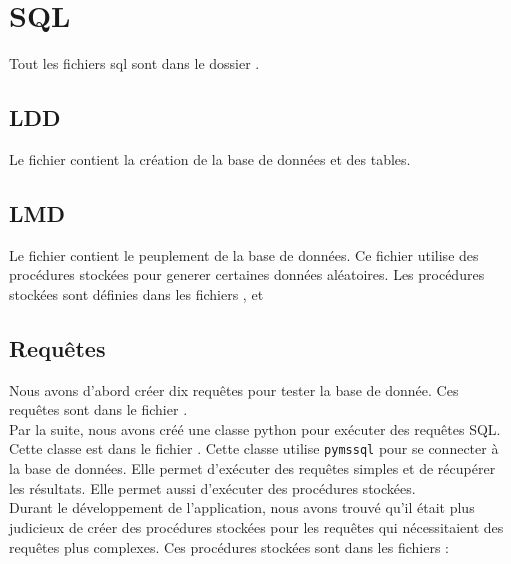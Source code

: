 \documentclass{article}
\newcommand{\n}{\\ [6pt]}
\begin{document}
\section{SQL}

Tout les fichiers sql sont dans le dossier
\href{https://github.com/ZGaillard/projet_session_2935/tree/main/database}{}.
\subsection{LDD}
Le fichier
\href{https://github.com/ZGaillard/projet_session_2935/blob/main/database/CreateUpdated.sql}{}
contient la création de la base de données et des tables.

\subsection{LMD}
Le fichier
\href{https://github.com/ZGaillard/projet_session_2935/blob/main/database/Populate.sql}{}
contient le peuplement de la base de données. Ce fichier utilise des
procédures stockées pour generer certaines données aléatoires.
Les procédures stockées sont définies dans les fichiers 
  \href{https://github.com/ZGaillard/projet_session_2935/blob/main/database/GenCastingArtistes.sql}{},
  \href{https://github.com/ZGaillard/projet_session_2935/blob/main/database/GenArtisteSport.sql}{}
  et
  \href{https://github.com/ZGaillard/projet_session_2935/blob/main/database/GenArtisteHabit.sql
  }{}

  \newpage
\subsection{Requêtes}
Nous avons d'abord créer dix requêtes pour tester la base de
donnée. Ces requêtes sont dans le fichier
\href{https://github.com/ZGaillard/projet_session_2935/blob/main/database/request.sql}{}.\n
Par la suite, nous avons créé une classe python pour exécuter des
requêtes SQL. Cette classe est dans le fichier \href{
  https://github.com/ZGaillard/projet_session_2935/blob/main/app/DBManager.py}{}.
Cette classe utilise \texttt{pymssql} pour se connecter à la base de
données. Elle permet d'exécuter des requêtes simples et de récupérer
les résultats. Elle permet aussi d'exécuter des procédures stockées.\n
Durant le développement de l'application, nous avons trouvé qu'il
était plus judicieux de créer des procédures stockées pour les
requêtes qui nécessitaient des requêtes plus complexes. Ces procédures
stockées sont dans les fichiers :
\end{document}
